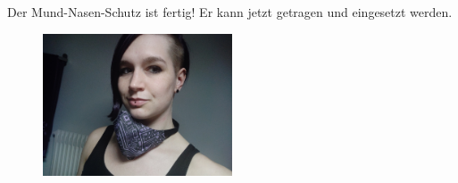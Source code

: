 \documentclass[12pt,parskip=full]{scrartcl}
\begin{document}
\vspace{0.2cm}
Der Mund-Nasen-Schutz ist fertig! Er kann jetzt getragen und eingesetzt werden.

\begin{figure}
    \centering
    \includegraphics[width = 0.5\textwidth]{Pictures/00_Completed/Gesamt2_resized.jpg}
    \label{Ready}
\end{figure}

\clearpage

\end{document}
